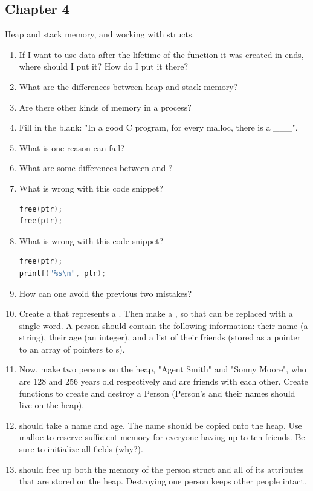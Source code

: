 \subsection{Chapter 4}

Heap and stack memory, and working with structs.

\begin{enumerate}
\item If I want to use data after the lifetime of the function it was created in ends, where should I put it? How do I put it there?
\item What are the differences between heap and stack memory?
\item Are there other kinds of memory in a process?
\item Fill in the blank: "In a good C program, for every malloc, there is a \_\_\_".
\item What is one reason  can fail?
\item What are some differences between  and ?
\item What is wrong with this code snippet?
\begin{lstlisting}[language=C]
free(ptr);
free(ptr);
\end{lstlisting}
\item What is wrong with this code snippet?
\begin{lstlisting}[language=C]
free(ptr);
printf("%s\n", ptr);
\end{lstlisting}
\item How can one avoid the previous two mistakes?
\item Create a  that represents a .
  Then make a , so that  can be replaced with a single word.
  A person should contain the following information: their name (a string), their age (an integer), and a list of their friends (stored as a pointer to an array of pointers to s).
\item Now, make two persons on the heap, "Agent Smith" and "Sonny Moore", who are 128 and 256 years old respectively and are friends with each other.
Create functions to create and destroy a Person (Person's and their names should live on the heap).
\item {} should take a name and age.
  The name should be copied onto the heap.
  Use malloc to reserve sufficient memory for everyone having up to ten friends.
  Be sure to initialize all fields (why?).
\item {} should free up both the memory of the person struct and all of its attributes that are stored on the heap. Destroying one person keeps other people intact.
\end{enumerate}

